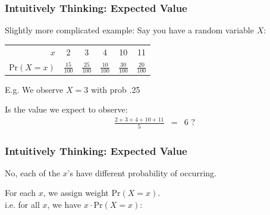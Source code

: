 \documentclass[slides]{beamer}
\newcommand{\blue}[1]{\textcolor{blue2}{#1}}
\newcommand{\prob}{\mbox{Pr}}
\begin{document}
%
%
%
\begin{frame}
\frametitle{Intuitively Thinking: Expected Value}
Slightly more complicated example:  Say you have a random variable $X$:
\begin{center}
\begin{tabular}{r|ccccc}
  \hline
$x$ & 2 & 3 & 4 & 10 & 11 \\ 
  $\prob(X=x)$ & $\frac{15}{100}$ & $\frac{25}{100}$ & $\frac{10}{100}$ & $\frac{30}{100}$ & $\frac{20}{100}$\\ 
   \hline
\end{tabular}
\end{center}

\vspace{0.5cm}

E.g. We observe $X=3$ with prob .25

\pause
\vspace{0.5cm}

Is the value we expect to observe: 
\begin{eqnarray*}
\frac{2 + 3 + 4 + 10 + 11}{5} &=& 6 \mbox{ ?}
\end{eqnarray*}

\end{frame}




\begin{frame}
\frametitle{Intuitively Thinking: Expected Value}
No, each of the $x$'s have different \blue{probability} of occurring.

\vspace{0.25cm}

\pause
For each $x$, we assign weight $\prob(X=x)$.\\
i.e. for all $x$, we have $x \cdot \prob(X=x)$:

\vspace{5cm}



\end{frame}
\end{document}
